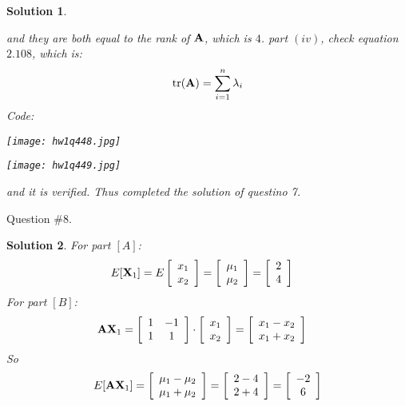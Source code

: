 \documentclass[11pt]{article}\usepackage[]{graphicx}\usepackage[]{color}
\newtheorem{sol}{Solution}
\begin{document}
\begin{sol}
\begin{center}
	\end{center}
	and they are both equal to the rank of ${\bf A}$, which is $4$.\vskip 2mm
	part $(iv)$, check equation $2.108$, which is:
	\begin{align*}
		\text{tr}({\bf A}) = \sum_{i = 1}^{n}\lambda_i
	\end{align*}
	Code:
	\begin{center}
		\texttt{[image: hw1q448.jpg]}
	\end{center}
	\begin{center}
		\texttt{[image: hw1q449.jpg]}
	\end{center}
	and it is verified.\vskip 2mm
	Thus completed the solution of questino 7.
 \end{sol}

Question $\# 8.$
\begin{sol}
	For part $[A]$:
	\begin{align*}
		E[{\bf X}_1] &= E\left[\begin{array}{c} x_1\\ x_2\end{array}\right] = \left[\begin{array}{c} \mu_1\\ \mu_2\end{array}\right] = \left[\begin{array}{c} 2\\ 4\end{array}\right]
	\end{align*}
	For part $[B]$:
	\begin{align*}
		{\bf A}{\bf X}_1&= \left[\begin{array}{cc} 1&-1 \\ 1& 1\end{array}\right]\cdot \left[\begin{array}{c} x_1\\ x_2\end{array}\right] = \left[\begin{array}{c} x_1 - x_2\\ x_1 + x_2\end{array}\right]
	\end{align*}
	So
	\begin{align*}
		E[{\bf A}{\bf X}_1] =  \left[\begin{array}{c} \mu_1 - \mu_2\\ \mu_1 + \mu_2\end{array}\right] =   \left[\begin{array}{c} 2 - 4\\ 2 + 4\end{array}\right] =   \left[\begin{array}{c} -2\\ 6\end{array}\right]

\end{align*}
\end{sol}
\end{document}
